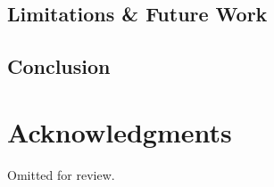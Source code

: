\documentclass{sigchi}
\begin{document}
\subsection{Limitations \& Future Work}
\subsection{Conclusion}
\section{Acknowledgments}

Omitted for review.

%
%
%
%
%
\balance{}




\end{document}
